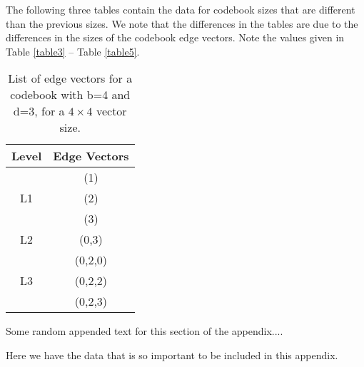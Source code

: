 The following three tables contain the data for codebook sizes that
are different than the previous sizes.  We note that the differences
in the tables are due to the differences in the sizes of the codebook
edge vectors.  Note the values given in Table \ref{table3} --
Table \ref{table5}.


\begin{table}[!t]
  \renewcommand{\arraystretch}{1.3}
  \centering

  \caption{List of edge vectors for a codebook with b=4 and d=3, for a
    $4 \times 4$ vector size.}
  \label{table2}

  \begin{tabular}{|c|c|} \hline
    Level & Edge Vectors \\ \hline

    & (1)\\
    L1 & (2)\\
    & (3) \\ \hline

    L2 & (0,3) \\ \hline

    & (0,2,0)\\
    L3 & (0,2,2)\\
    & (0,2,3) \\ \hline

  \end{tabular}

\end{table}




\label{sec:back}


Some random appended text for this section of the appendix....


\label{sec:meat}

Here we have the data that is so important to be included in this
appendix.
